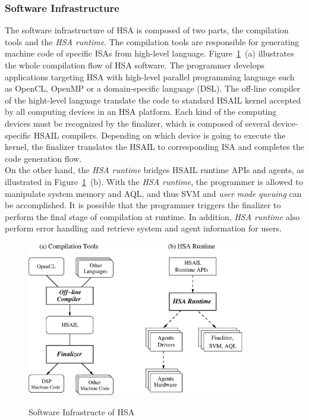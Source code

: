 \documentclass[12pt]{article}
\begin{document}
\begin{CJK}{UTF8}{bkai}
        \subsubsection{Software Infrastructure}
        The software infrastructure of HSA is composed of two parts, the compilation tools and the \textit{HSA runtime}.   
        The compilation tools are responsible for generating machine code of specific ISAs from high-level language.
        Figure~\ref{fig:swinf}~(a) illustrates the whole compilation flow of HSA software.
        The programmer develops applications targeting HSA with high-level parallel programming language such as OpenCL, OpenMP or a domain-specific language (DSL).
        The off-line compiler of the hight-level language translate the code to standard HSAIL kernel accepted by all computing devices in an HSA platform.
        Each kind of the computing devices must be recognized by the finalizer, 
        which is composed of several device-specific HSAIL compilers.
        Depending on which device is going to execute the kernel, 
        the finalizer translates the HSAIL to corresponding ISA and completes the code generation flow.
        \\\indent
        On the other hand, the \textit{HSA runtime} bridges HSAIL runtime APIs and agents, as illustrated in Figure~\ref{fig:swinf}~(b).
        With the \textit{HSA runtime}, the programmer is allowed to manipulate system memory and AQL, 
        and thus SVM and \textit{user mode queuing} can be accomplished.
        It is possible that the programmer triggers the finalizer to perform the final stage of compilation at runtime.
        In addition, \textit{HSA runtime} also perform error handling and retrieve system and agent information for users.
        \begin{figure}[!ht] 
            \caption{Software Infrastructe of HSA}
            \centering
            \includegraphics[width=0.85\textwidth]{./figs/swinf.eps}
            \label{fig:swinf}
        \end{figure}

\end{CJK}
\end{document}
